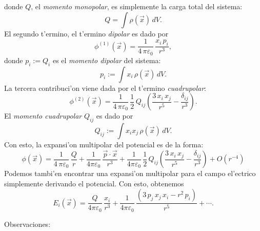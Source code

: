donde $Q$, el \textit{momento monopolar}, es simplemente la carga total del sistema:
\begin{equation} \label{eq3.2.6}
Q=\int \rho(\vec{x})\,dV.
\end{equation}
El segundo t'ermino, el t'ermino {\em dipolar} es dado por
\begin{equation}
\phi^{(1)}(\vec{x}) =\frac{1}{4\,\pi\varepsilon_0}\,\frac{x_i\,p_i}{r^3},
\end{equation}
donde $p_i:=Q_i$ es el \textit{momento dipolar} del sistema:
\begin{equation} \label{eq3.2.8}
p_i:=\int x_i\,\rho(\vec{x})\,dV.
\end{equation}
La tercera contribuci'on viene dada por el t'ermino {\em cuadrupolar}:
\begin{equation} \label{eq3.2.9}
\phi^{(2)}(\vec{x})=\frac{1}{4\,\pi\varepsilon_0}\,\frac{1}{2}\,Q_{ij}
\left(\frac{3\,x_i\,x_j}{r^5}-\frac{\delta_{ij}}{r^3}\right).
\end{equation}
El \textit{momento cuadrupolar} $Q_{ij}$ es dado por
\begin{equation}
Q_{ij}:=\int x_ix_j\,\rho(\vec{x})\,dV. \label{mom4}
\end{equation}
Con esto, la expansi'on multipolar del potencial es de la forma:
\begin{equation} \label{eq3.2.12}
\boxed{\phi(\vec{x})=\frac{1}{4\,\pi\varepsilon_0}\,\frac{Q}{r}+
\frac{1}{4\pi\varepsilon_0}\,\frac{\vec{p}\cdot\vec{x}}{r^3}+
\frac{1}{4\pi\varepsilon_0}\,\frac{1}{2}\,Q_{ij}\left(\frac{3\,x_i\,x_j}{
r^5}-\frac{\delta_{ij}}{r^3}\right)+O(r^{-4})}
\end{equation}
Podemos tambi'en encontrar una expansi'on multipolar para el campo el'ectrico
simplemente derivando el potencial. Con esto, obtenemos
\begin{equation} \label{eq3.2.12.1}
E_i(\vec{x})=\frac{Q}{4\pi\varepsilon_0}\,\frac{x_i}{r^3}+\frac{1}{
4\pi\varepsilon_0}\,\frac{(3\,p_j\,x_j\,x_i-r^2\,p_i)}{r^5}+\cdots .
\end{equation}

Observaciones:


